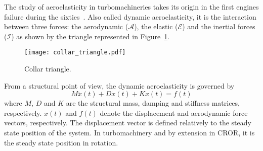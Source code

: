 
The study of aeroelasticity in turbomachineries takes its origin
in the first engines failure during the sixties~\cite{Dugundji2003}.
Also called dynamic aeroelasticity,
it is the interaction between three forces:
the aerodynamic ($\mathcal{A}$), the elastic ($\mathcal{E}$) and
the inertial forces ($\mathcal{I}$) as 
shown by the \citet{Collar1946} triangle represented in 
Figure~\ref{fig:ael_collar_triangle}. 
\begin{figure}[htp]
  \centering
  \texttt{[image: collar\_triangle.pdf]}
  \caption{Collar triangle.}
  \label{fig:ael_collar_triangle}
\end{figure}

From a structural point of view, 
the dynamic aeroelasticity is governed by
\begin{equation}
	M \ddot{x}(t) + D \dot{x}(t) + K x(t) = f(t)
	\label{eq:ael_motion_eq}
\end{equation}
where $M$, $D$ and $K$ are the structural mass, damping 
and stiffness matrices, respectively.
$x(t)$ and $f(t)$ denote the displacement 
and aerodynamic force vectors, respectively. The displacement
vector is defined relatively to the 
steady state position of the system. In turbomachinery
and by extension in CROR, it is the steady state position
in rotation.
